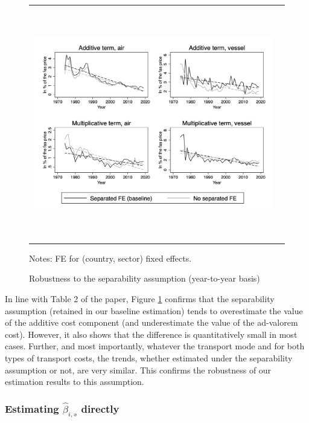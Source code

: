\documentclass[11pt,twoside, authoryear]{elsarticle}
\begin{document}
\begin{figure}[htbp]
\caption{Robustness to the separability assumption (year-to-year basis)}
\label{fig:robustesse_non_separe}
\begin{center}
\begin{tabular}{cc}
\includegraphics[width=6in, height=4in]{graph_robustesse_ns.jpg}

\end{tabular}
\end{center}
\begin{minipage} [c]  {5in} \scriptsize%
Notes: FE for (country, sector) fixed effects.
\end{minipage}
\end{figure}

In line with Table 2 of the paper, Figure \ref{fig:robustesse_non_separe} confirms that the separability assumption (retained in our baseline estimation) tends to overestimate the value of the additive cost component (and underestimate the value of the ad-valorem cost).
However, it also shows that the difference is quantitatively small in most cases. Further, and most importantly, whatever the transport mode and for both types of transport costs, the trends, whether estimated under the separability assumption or not, are very similar.
This confirms the robustness of our estimation results to this assumption.




\subsubsection{Estimating $\widehat{\beta}_{i,s}$ directly}
	
\end{document}
